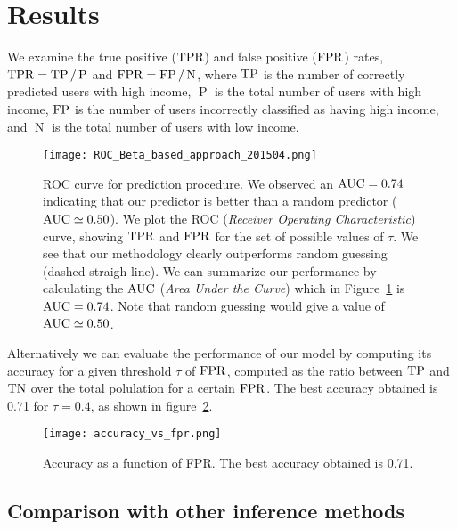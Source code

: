 \section{Results}

We examine the true positive ($\operatorname{TPR}$) and false positive ($\operatorname{FPR}$) rates, $\operatorname{TPR} = \operatorname{TP} / \operatorname{P}$ and $\operatorname{FPR} = \operatorname{FP} / \operatorname{N}$, where $\operatorname{TP}$ is the number of correctly predicted users with high income, $\operatorname{P}$ is the total number of users with high income, $\operatorname{FP}$ is the number of users incorrectly classified as having high income, and $\operatorname{N}$ is the total number of users with low income.

\begin{figure}[ht]
\begin{center}
{\texttt{[image: ROC\_Beta\_based\_approach\_201504.png]}}
\caption{ROC curve for prediction procedure. We observed an $\operatorname{AUC} = 0.74$ indicating that our predictor is better than a random predictor ($\operatorname{AUC} \simeq 0.50$). We plot the ROC (\textit{Receiver Operating Characteristic}) curve, showing $\operatorname{TPR}$ and $\operatorname{FPR}$ for the set of possible values of $\tau$. We see that our methodology clearly outperforms random guessing (dashed straigh line). We can summarize our performance by calculating  the $\operatorname{AUC}$ (\textit{Area Under the Curve}) which in Figure~\ref{ROC_multiclass} is $\operatorname{AUC} = 0.74$. Note that random guessing would give a value of $\operatorname{AUC} \simeq 0.50$.
}

\label{ROC_multiclass}
\end{center}
\end{figure}

Alternatively we can evaluate the performance of our model by computing its accuracy for a given threshold $\tau$ of $\operatorname{FPR}$, computed as the ratio between $\operatorname{TP}$ and $\operatorname{TN}$ over the total polulation for a certain $\operatorname{FPR}$. The best accuracy obtained is \num{0.71} for $\tau = 0.4$, as shown in figure~\ref{fig:accuracy_vs_fpr}.

\begin{figure}[ht]
\begin{center}
{\texttt{[image: accuracy\_vs\_fpr.png]}}
\caption{Accuracy as a function of FPR\@. The best accuracy obtained is 0.71.}
\label{fig:accuracy_vs_fpr}
\end{center}
\end{figure}

\subsection{Comparison with other inference methods}

